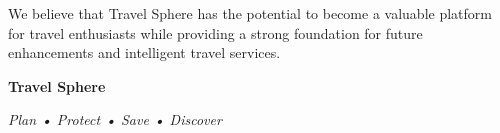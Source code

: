 \documentclass[12pt,a4paper]{article}
\begin{document}
We believe that Travel Sphere has the potential to become a valuable platform for travel enthusiasts while providing a strong foundation for future enhancements and intelligent travel services.

\vspace{0.8cm}

\begin{center}
{\large \textbf{Travel Sphere}}\par
\vspace{0.15cm}
\textit{Plan • Protect • Save • Discover}
\end{center}
\end{document}
